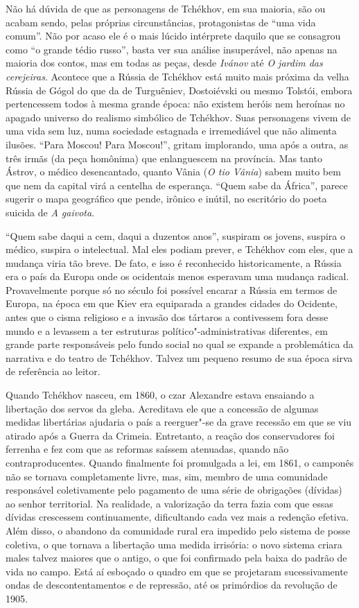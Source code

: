 Não há dúvida de que as personagens de Tchékhov, em sua maioria,
são ou acabam sendo, pelas próprias circunstâncias, protagonistas
de ``uma vida comum''. Não por acaso ele é o mais lúcido
intérprete daquilo que se consagrou como ``o grande tédio russo'',
basta ver sua análise insuperável, não apenas na maioria dos contos,
mas em todas as peças, desde \emph{Ivánov} até \emph{O jardim das
cerejeiras}. Acontece que a Rússia de Tchékhov está muito mais
próxima da velha Rússia de Gógol do que da de Turguêniev,
Dostoiévski ou mesmo Tolstói, embora pertencessem todos à mesma
grande época: não existem heróis nem heroínas no apagado universo
do realismo simbólico de Tchékhov. Suas personagens vivem de uma
vida sem luz, numa sociedade estagnada e irremediável que não
alimenta ilusões. ``Para Moscou! Para Moscou!'', gritam implorando,
uma após a outra, as três irmãs (da peça homônima) que enlanguescem
na província. Mas tanto Ástrov, o médico desencantado, quanto Vânia
(\emph{O tio Vânia}) sabem muito bem que nem da capital virá a
centelha de esperança. ``Quem sabe da África'', parece sugerir o
mapa geográfico que pende, irônico e inútil, no escritório do poeta
suicida de \emph{A gaivota}.

``Quem sabe daqui a cem, daqui a duzentos anos'', suspiram os
jovens, suspira o médico, suspira o intelectual. Mal eles podiam
prever, e Tchékhov com eles, que a mudança viria tão breve. De
fato, e isso é reconhecido historicamente, a Rússia era o país
da Europa onde os ocidentais menos esperavam uma mudança radical.
Provavelmente porque só no século  foi possível encarar
a Rússia em termos de Europa, na época em que Kiev era equiparada
a grandes cidades do Ocidente, antes que o cisma religioso e a
invasão dos tártaros a contivessem fora desse mundo e a levassem
a ter estruturas político"-administrativas diferentes, em grande
parte responsáveis pelo fundo social no qual se expande a problemática
da narrativa e do teatro de Tchékhov. Talvez um pequeno resumo de sua
época sirva de referência ao leitor.

Quando Tchékhov nasceu, em 1860, o czar Alexandre 
estava ensaiando a libertação dos servos da gleba. Acreditava ele
que a concessão de algumas medidas libertárias ajudaria o país a
reerguer"-se da grave recessão em que se viu atirado após a
Guerra da Crimeia. Entretanto, a reação dos conservadores foi
ferrenha e fez com que as reformas saíssem atenuadas, quando
não contraproducentes. Quando finalmente foi promulgada a lei, em
1861, o camponês não se tornava completamente livre, mas, sim,
membro de uma comunidade responsável coletivamente pelo pagamento
de uma série de obrigações (dívidas) ao senhor territorial. Na
realidade, a valorização da terra fazia com que essas dívidas
crescessem continuamente, dificultando cada vez mais a redenção
efetiva. Além disso, o abandono da comunidade rural era impedido
pelo sistema de posse coletiva, o que tornava a libertação uma
medida irrisória: o novo sistema criara males talvez maiores que
o antigo, o que foi confirmado pela baixa do padrão de vida no
campo. Está aí esboçado o quadro em que se projetaram sucessivamente
ondas de descontentamentos e de repressão, até os primórdios da revolução
de 1905.


